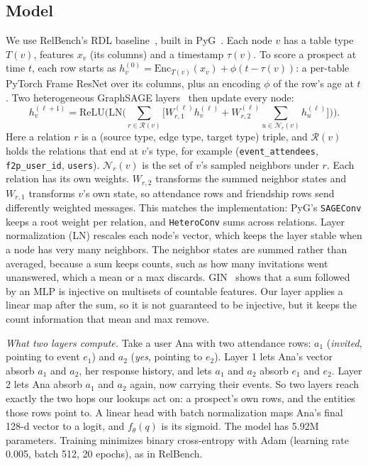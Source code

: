 \documentclass{article}
\begin{document}
\subsection{Model}
We use RelBench's RDL baseline~\cite{fey2024rdl}, built in PyG~\cite{fey2019pyg}. Each node $v$ has a table type $T(v)$, features $x_v$ (its columns) and a timestamp $\tau(v)$. To score a prospect at time $t$, each row starts as $h_v^{(0)} = \mathrm{Enc}_{T(v)}(x_v) + \phi(t - \tau(v))$: a per-table PyTorch Frame ResNet over its columns, plus an encoding $\phi$ of the row's age at $t$. Two heterogeneous GraphSAGE layers~\cite{hamilton2017sage} then update every node:
\begin{equation}
  h_v^{(\ell+1)} = \mathrm{ReLU}\Big(\mathrm{LN}\Big(\textstyle\sum_{r \in \mathcal{R}(v)} \big[ W^{(\ell)}_{r,1} h_v^{(\ell)} + W^{(\ell)}_{r,2} \sum_{u \in \mathcal{N}_r(v)} h_u^{(\ell)} \big]\Big)\Big).
  \label{eq:sage}
\end{equation}
Here a relation $r$ is a (source type, edge type, target type) triple, and $\mathcal{R}(v)$ holds the relations that end at $v$'s type, for example (\texttt{event\_attendees}, \texttt{f2p\_user\_id}, \texttt{users}). $\mathcal{N}_r(v)$ is the set of $v$'s sampled neighbors under $r$. Each relation has its own weights. $W_{r,2}$ transforms the summed neighbor states and $W_{r,1}$ transforms $v$'s own state, so attendance rows and friendship rows send differently weighted messages. This matches the implementation: PyG's \texttt{SAGEConv} keeps a root weight per relation, and \texttt{HeteroConv} sums across relations. Layer normalization (LN) rescales each node's vector, which keeps the layer stable when a node has very many neighbors. The neighbor states are summed rather than averaged, because a sum keeps counts, such as how many invitations went unanswered, which a mean or a max discards. GIN~\cite{xu2019gin} shows that a sum followed by an MLP is injective on multisets of countable features. Our layer applies a linear map after the sum, so it is not guaranteed to be injective, but it keeps the count information that mean and max remove.

\emph{What two layers compute.} Take a user Ana with two attendance rows: $a_1$ (\emph{invited}, pointing to event $e_1$) and $a_2$ (\emph{yes}, pointing to $e_2$). Layer 1 lets Ana's vector absorb $a_1$ and $a_2$, her response history, and lets $a_1$ and $a_2$ absorb $e_1$ and $e_2$. Layer 2 lets Ana absorb $a_1$ and $a_2$ again, now carrying their events. So two layers reach exactly the two hops our lookups act on: a prospect's own rows, and the entities those rows point to. A linear head with batch normalization maps Ana's final 128-d vector to a logit, and $f_\theta(q)$ is its sigmoid. The model has 5.92M parameters. Training minimizes binary cross-entropy with Adam (learning rate 0.005, batch 512, 20 epochs), as in RelBench.
\end{document}
